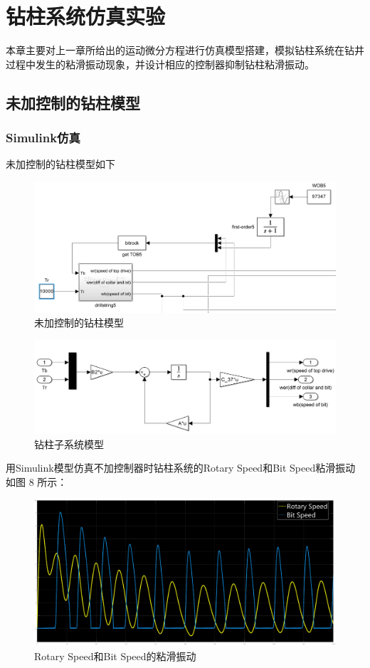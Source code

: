 \documentclass[12pt,hyperref,a4paper,UTF8]{ctexart}
\begin{document}
	\newpage
	\section{钻柱系统仿真实验}
	本章主要对上一章所给出的运动微分方程进行仿真模型搭建，模拟钻柱系统在钻井过程中发生的粘滑振动现象，并设计相应的控制器抑制钻柱粘滑振动。
	
	
	\subsection{未加控制的钻柱模型}
	
	\subsubsection{Simulink仿真}
	未加控制的钻柱模型如下
	
	\begin{figure}[!htbp]
		\centering
		\includegraphics[width=0.6\linewidth]{figures/未加控制}
		\caption{未加控制的钻柱模型}
		\label{fig:未加控制}
	\end{figure}
	
	
	
	\begin{figure}[!htbp]
		\centering
		\includegraphics[width=0.6\linewidth]{figures/钻柱子系统}
		\caption{钻柱子系统模型}
		\label{fig:钻柱子系统}
	\end{figure}
	
	用Simulink模型仿真不加控制器时钻柱系统的Rotary Speed和Bit Speed粘滑振动如图 8 所示：
	
	\begin{figure}[!htbp]
		\centering
		\includegraphics[width=0.7\linewidth]{figures/Rotary_Speed和Bit_Speed的粘滑振动}
		\caption{Rotary Speed和Bit Speed的粘滑振动}
		\label{fig:Rotary_Speed和Bit_Speed的粘滑振动}
	\end{figure}
	
\end{document}

